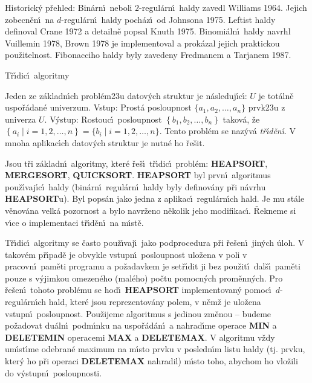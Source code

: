 \flushpar Historick\'y p\v rehled: Bin\'arn\'\i\ neboli $2$-regul\'arn\'\i\ 
haldy zavedl Williams 1964. Jejich zobecn\v e\-n\'\i\ na $d$-regul\'arn\'\i\ 
haldy poch\'az\'\i\ od Johnsona 1975. Leftist haldy definoval Crane 1972 
a detailn\v e popsal Knuth 1975. Binomi\'aln\'\i\ haldy navrhl Vuillemin 1978, 
Brown 1978 je implementoval a prok\'azal jejich praktickou pou\v zitelnost. 
Fibonacciho haldy byly zavedeny Fredmanem a Tarjanem 1987.
  
\heading
T\v r\'\i dic\'\i\ algoritmy
\endheading

\flushpar Jeden ze z\'akladn\'\i ch probl\'em\accent23u datov\'ych 
struktur je n\'asleduj\'\i c\'\i :\newline 
$U$ je tot\'aln\v e uspo\v r\'adan\'e univerzum.\newline 
Vstup: Prost\'a posloupnost $\{a_1,a_2,\dots,a_n\}$ prvk\accent23u z 
univerza $U$.\newline 
V\'ystup: Rostouc\'\i\ posloupnost $\left\{b_1,b_2,\dots,b_n\right\}$ takov\'a, \v ze 
$\left\{a_i\mid i=1,2,\dots,n\right\}=\{b_i\mid i=1,2,\dots,n\}$.
Tento probl\'em se naz\'yv\'a \emph{t\v r\'\i d\v en\'\i}. V mnoha 
aplikac\'\i ch datov\'ych struktur je nutn\'e ho \v re\v sit. 
\medskip

\flushpar Jsou t\v ri z\'akladn\'\i\ algoritmy, kter\'e  \v re\v s\'\i\ t\v r\'\i dic\'\i\ 
probl\'em: {\bf HEAP\-SORT}, {\bf MERGESORT}, {\bf QUICKSORT}. 
{\bf HEAPSORT} byl prvn\'\i\ algoritmus pou\v z\'\i vaj\'\i c\'\i\ 
haldy (bin\'arn\'\i\ regul\'ar\-n\'\i\ haldy by\-ly definov\'any p\v ri 
n\'avrhu {\bf HEAP\-SORT}u). Byl pops\'an jako jedna z 
aplikac\'\i\ regul\'arn\'\i ch hald. Je mu  
st\'ale v\v enov\'ana velk\'a pozornost a bylo navr\v ze\-no n\v ekolik 
jeho modifikac\'\i . \v Rekneme si v\'\i ce o implementaci 
t\v r\'\i d\v en\'\i\ na m\'\i st\v e.
\medskip

\flushpar T\v r\'\i dic\'\i\ algoritmy se \v casto pou\v z\'\i vaj\'\i\ jako 
podprocedura p\v ri \v re\-\v se\-n\'\i\ jin\'ych \'uloh. V takov\'em p\v r\'\i pad\v e je 
obvykle vstupn\'\i\ posloupnost ulo\v zena v poli v pracovn\'\i\ 
pam\v eti programu a po\v za\-dav\-kem  je set\v r\'\i dit ji 
bez pou\v zit\'\i\ dal\v s\'\i\ 
pam\v eti pouze s v\'yjimkou omezen\'eho (mal\'eho) po\v ctu pomocn\'ych 
prom\v enn\'ych. Pro \v re\v se\-n\'\i\ tohoto probl\'emu se hod\'\i\ 
{\bf HEAPSORT} implementovan\'y pomoc\'\i\ 
$d$-regul\'arn\'\i ch hald, kter\'e jsou reprezentov\'any  
polem, v n\v em\v z je ulo\v zena vstupn\'\i\ posloupnost. Pou\v zijeme 
algoritmus s jedinou zm\v enou -- budeme po\v zadovat du\'aln\'\i\ 
podm\'\i nku na uspo\v r\'ad\'an\'\i\ 
a nahrad\'\i me operace {\bf MIN} a {\bf DELETEMIN }
ope\-racemi {\bf MAX} a {\bf DELETEMAX}. V algoritmu v\v zdy um\'\i st\'\i\-me 
odebran\'e maximum na m\'\i sto prvku v posled\-n\'\i m listu 
haldy (tj. prvku, kter\'y ho p\v ri operaci {\bf DELETEMAX }
nahradil) m\'\i sto toho, abychom ho vlo\v zili 
do v\'ystupn\'\i\ posloupnosti. 
\medskip

